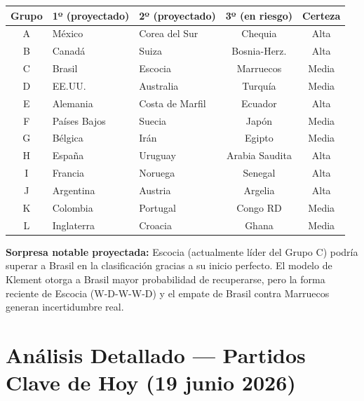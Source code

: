 \documentclass[11pt,a4paper]{article}
\begin{document}
\begin{center}
\begin{tabular}{@{}cllcc@{}}
\toprule
\textbf{Grupo} & \textbf{1º (proyectado)} & \textbf{2º (proyectado)} & \textbf{3º (en riesgo)} & \textbf{Certeza} \\
\midrule
\rowcolor{tablerow}
A & México & Corea del Sur & Chequia & Alta \\
B & Canadá & Suiza & Bosnia-Herz. & Alta \\
\rowcolor{tablerow}
C & Brasil & Escocia & Marruecos & Media \\
D & EE.UU. & Australia & Turquía & Media \\
\rowcolor{tablerow}
E & Alemania & Costa de Marfil & Ecuador & Alta \\
F & Países Bajos & Suecia & Japón & Media \\
\rowcolor{tablerow}
G & Bélgica & Irán & Egipto & Media \\
H & España & Uruguay & Arabia Saudita & Alta \\
\rowcolor{tablerow}
I & Francia & Noruega & Senegal & Alta \\
J & Argentina & Austria & Argelia & Alta \\
\rowcolor{tablerow}
K & Colombia & Portugal & Congo RD & Media \\
L & Inglaterra & Croacia & Ghana & Media \\
\bottomrule
\end{tabular}
\end{center}

\vspace{0.3cm}
{\small \textbf{Sorpresa notable proyectada:} Escocia (actualmente líder del Grupo C) podría 
superar a Brasil en la clasificación gracias a su inicio perfecto. El modelo de Klement 
otorga a Brasil mayor probabilidad de recuperarse, pero la forma reciente de Escocia 
(W-D-W-W-D) y el empate de Brasil contra Marruecos generan incertidumbre real.}

\newpage

\section{Análisis Detallado — Partidos Clave de Hoy (19 junio 2026)}
\end{document}
